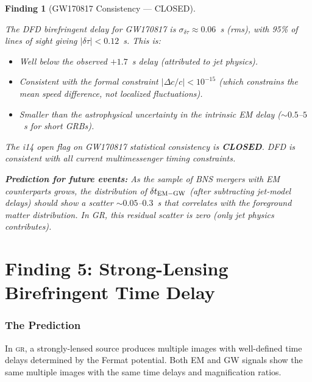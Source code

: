 \documentclass[11pt]{article}
\newtheorem{finding}{Finding}
\newcommand{\GR}{\textsc{gr}}
\begin{document}
\begin{finding}[GW170817 Consistency --- CLOSED]\label{find:gw170817}

The DFD birefringent delay for GW170817 is $\sigma_{\delta\tau}
\approx 0.06$~s (rms), with 95\% of lines of sight giving
$|\delta\tau| < 0.12$~s. This is:
\begin{itemize}[nosep]
\item Well below the observed $+1.7$~s delay (attributed to jet physics).
\item Consistent with the formal constraint $|\Delta c/c| < 10^{-15}$
  (which constrains the \emph{mean} speed difference, not localized
  fluctuations).
\item Smaller than the astrophysical uncertainty in the intrinsic
  EM delay ($\sim 0.5$--$5$~s for short GRBs).
\end{itemize}

The i14 open flag on GW170817 statistical consistency is
\textbf{CLOSED}. DFD is consistent with all current multimessenger
timing constraints.

\textbf{Prediction for future events:} As the sample of BNS mergers
with EM counterparts grows, the distribution of $\delta t_{\rm EM-GW}$
(after subtracting jet-model delays) should show a scatter
$\sim 0.05$--$0.3$~s that correlates with the foreground matter
distribution. In GR, this residual scatter is zero (only jet physics
contributes).
\end{finding}


\part{Finding 5: Strong-Lensing Birefringent Time Delay}
\label{part:strong-lens-time}

\section{The Prediction}

In \GR, a strongly-lensed source produces multiple images with
well-defined time delays determined by the Fermat potential. Both
EM and GW signals show the same multiple images with the same time
delays and magnification ratios.
\end{document}
